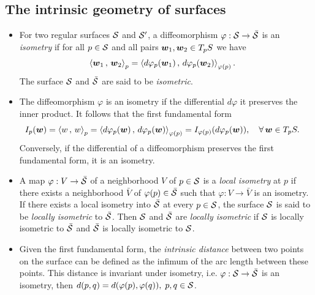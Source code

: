 \documentclass[11pt]{article}
\begin{document}
\subsection{The intrinsic geometry of surfaces}
\begin{itemize}
\item   \begin{definition}
For two regular surfaces ${\mathcal S}$ and ${\mathcal S}'$, a diffeomorphism $\varphi: {\mathcal S} \rightarrow \bar{{\mathcal S}}$ is an \emph{isometry} if for all $p\in {\mathcal S}$ and all pairs $\boldsymbol{w}_{1}, \boldsymbol{w}_{2} \in T_{p}S$ we have
\begin{align*}
\left\langle \boldsymbol{w}_{1}\,,\, \boldsymbol{w}_{2} \right\rangle_{p} &= \left\langle d\varphi_{p}(\boldsymbol{w}_{1})\,,\, d\varphi_{p}(\boldsymbol{w}_{2}) \right\rangle_{\varphi(p)}.
\end{align*} 
The surface ${\mathcal S}$ and $\bar{{\mathcal S}}$ are said to be \emph{isometric}. 
\end{definition}

\item \begin{remark}
 The diffeomorphism $\varphi$ is an isometry if the differential $d\varphi$ it preserves the inner product. It follows that the first fundamental form 
\begin{align*}
I_{p}(\boldsymbol{w}) &= \left\langle w\,,\, w \right\rangle_{p} = \left\langle d\varphi_{p}(\boldsymbol{w})\,,\, d\varphi_{p}(\boldsymbol{w}) \right\rangle_{\varphi(p)} = I_{\varphi(p)}(d\varphi_{p}(\boldsymbol{w})),\quad \forall\,\boldsymbol{w}\in T_{p}S.
\end{align*}  Conversely, if the differential of a diffeomorphism preserves the first fundamental form, it is an isometry. 
\end{remark}

\item \begin{definition}
 A map $\varphi: V \rightarrow \bar{{\mathcal S}}$ of a neighborhood $V$ of $p\in {\mathcal S}$ is a \emph{local isometry} at $p$ if there exists a neighborhood $\bar{V}$ of $\varphi(p) \in \bar{{\mathcal S}}$ such that $\varphi: V \rightarrow \bar{V}$ is an isometry.  If there exists a local isometry into $\bar{{\mathcal S}}$ at every $p\in {\mathcal S}$, the surface ${\mathcal S}$ is said to be \emph{locally isometric} to $\bar{{\mathcal S}}$. Then ${\mathcal S}$ and $\bar{{\mathcal S}}$ are \emph{locally isometric} if ${\mathcal S}$ is locally isometric to $\bar{{\mathcal S}}$ and $\bar{{\mathcal S}}$ is locally isometric to ${\mathcal S}$. 
 \end{definition}



\item \begin{definition} 
Given the first fundamental form, the \emph{intrinsic distance} between two points on the surface can be defined as the infimum of the arc length between these points. This distance is invariant under isometry, i.e. $\varphi: {\mathcal S} \rightarrow \bar{{\mathcal S}}$ is an isometry, then $d(p,q) = d(\varphi(p), \varphi(q)),\; p,q\in {\mathcal S}$.
\end{definition}


\end{itemize}
\end{document}
